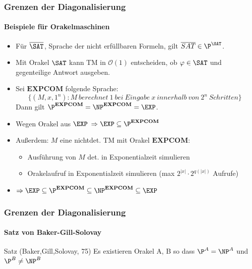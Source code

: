 \begin{frame}
	\frametitle{Grenzen der Diagonalisierung}
	\framesubtitle{Beispiele für Orakelmaschinen}
	\heading{$\overline{\SAT}$}
	\begin{itemize}[<+->]
		\item   Für $\overline{\SAT}$, Sprache der nicht erfüllbaren Formeln, gilt
		$\overline{SAT} \in {\P}^{\SAT}$.
		\item   Mit  Orakel $\SAT$ kann TM in $\mathcal{O}(1)$ entscheiden, ob
		$\varphi \in \SAT$ und gegenteilige Antwort ausgeben.
	\end{itemize}
	\bigskip
	\pause
	\begin{itemize} [<+->]
		\item Sei $\mathbf{EXPCOM}$ folgende Sprache: \[\{(M,x,1^n) : M \ berechnet \ 1 \ bei \ Eingabe \ x \ innerhalb \ von \ 2^n \ Schritten  \}
		 \] 
			Dann gilt ${\P}^{\mathbf{EXPCOM}} = {\NP}^{\mathbf{EXPCOM}} = \EXP$.
			\item Wegen Orakel aus $\EXP$  $ \Rightarrow \EXP \subseteq {\P}^{\mathbf{EXPCOM}} $
			\item Außerdem: $M$ eine nichtdet. TM mit Orakel $\mathbf{EXPCOM}$: 
				\begin{itemize}[<+->]
					\item Ausführung von $M$ det. in Exponentialzeit simulieren
					\item Orakelaufruf in Exponentialzeit simulieren (max $2^{|x|} \cdot 2^{q(|x|)}$ Aufrufe)	
				\end{itemize}
			\item $\Rightarrow \EXP \subseteq{\P}^{\mathbf{EXPCOM}} \subseteq {\NP}^{\mathbf{EXPCOM}} \subseteq \EXP$
			
	\end{itemize}
\end{frame}
\begin{frame}
	\frametitle{Grenzen der Diagonalisierung}
	\framesubtitle{Satz von Baker-Gill-Solovay}
	\begin{KITinfoblock}{Satz (Baker,Gill,Solovay, 75)}
		Es existieren Orakel A, B so dass ${\P}^A = {\NP}^A$ und ${\P}^B \neq {\NP}^B$
	\end{KITinfoblock}
	\bigskip
	\pause
	\begin{overprint}
		
	\end{overprint}
\end{frame}

